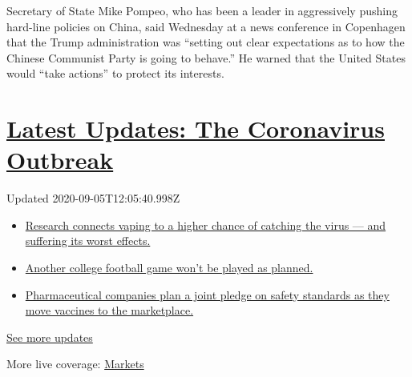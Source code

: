 Secretary of State Mike Pompeo, who has been a leader in aggressively
pushing hard-line policies on China, said Wednesday at a news conference
in Copenhagen that the Trump administration was ``setting out clear
expectations as to how the Chinese Communist Party is going to behave.''
He warned that the United States would ``take actions'' to protect its
interests.

\hypertarget{latest-updates-the-coronavirus-outbreak}{%
\section{\texorpdfstring{\href{https://www.nytimes3xbfgragh.onion/2020/09/04/world/covid-19-coronavirus.html?action=click\&pgtype=Article\&state=default\&region=MAIN_CONTENT_1\&context=storylines_live_updates}{Latest
Updates: The Coronavirus
Outbreak}}{Latest Updates: The Coronavirus Outbreak}}\label{latest-updates-the-coronavirus-outbreak}}

Updated 2020-09-05T12:05:40.998Z

\begin{itemize}
\tightlist
\item
  \href{https://www.nytimes3xbfgragh.onion/2020/09/04/world/covid-19-coronavirus.html?action=click\&pgtype=Article\&state=default\&region=MAIN_CONTENT_1\&context=storylines_live_updates\#link-1654f6ad}{Research
  connects vaping to a higher chance of catching the virus --- and
  suffering its worst effects.}
\item
  \href{https://www.nytimes3xbfgragh.onion/2020/09/04/world/covid-19-coronavirus.html?action=click\&pgtype=Article\&state=default\&region=MAIN_CONTENT_1\&context=storylines_live_updates\#link-52e4198a}{Another
  college football game won't be played as planned.}
\item
  \href{https://www.nytimes3xbfgragh.onion/2020/09/04/world/covid-19-coronavirus.html?action=click\&pgtype=Article\&state=default\&region=MAIN_CONTENT_1\&context=storylines_live_updates\#link-181cef0}{Pharmaceutical
  companies plan a joint pledge on safety standards as they move
  vaccines to the marketplace.}
\end{itemize}

\href{https://www.nytimes3xbfgragh.onion/2020/09/04/world/covid-19-coronavirus.html?action=click\&pgtype=Article\&state=default\&region=MAIN_CONTENT_1\&context=storylines_live_updates}{See
more updates}

More live coverage:
\href{https://www.nytimes3xbfgragh.onion/live/2020/09/04/business/stock-market-today-coronavirus?action=click\&pgtype=Article\&state=default\&region=MAIN_CONTENT_1\&context=storylines_live_updates}{Markets}

